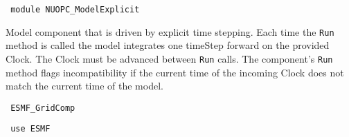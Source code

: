  
\setlength{\parskip}{0pt}
\setlength{\parindent}{0pt}
\setlength{\baselineskip}{11pt}
 
\def\bv{\begin{verbatim}}
\def\ev{\end{verbatim}}
\def\be{\begin{equation}}
\def\ee{\end{equation}}
\def\bea{\begin{eqnarray}}
\def\eea{\end{eqnarray}}
\def\bi{\begin{itemize}}
\def\ei{\end{itemize}}
\def\bn{\begin{enumerate}}
\def\en{\end{enumerate}}
\def\bd{\begin{description}}
\def\ed{\end{description}}
\def\({\left (}
\def\){\right )}
\def\[{\left [}
\def\]{\right ]}
\def\<{\left  \langle}
\def\>{\right \rangle}
\def\cI{{\cal I}}
\def\diag{\mathop{\rm diag}}
\def\tr{\mathop{\rm tr}}


\begin{verbatim} module NUOPC_ModelExplicit
\end{verbatim}

Model component that is driven by explicit time stepping. Each time the {\tt Run} method is called the model integrates one timeStep forward on the provided Clock. The Clock must be advanced between {\tt Run} calls. The component's {\tt Run} method flags incompatibility if the current time of the incoming Clock does not match the current time of the model.

\begin{verbatim} ESMF_GridComp
\end{verbatim}

\begin{verbatim} use ESMF
\end{verbatim}

